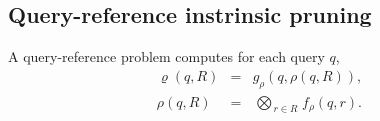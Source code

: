\documentclass[twoside,leqno,twocolumn]{article}
\newcommand{\bigvec}[1]{\mathop{\overrightarrow{#1}}}
\newcommand{\summary}{\hat{\sigma}}
\newcommand{\lo}[1]{#1^{l}}
\newcommand{\up}[1]{#1^{u}}
\newcommand{\distlo}{\lo{d}}
\newcommand{\distup}{\up{d}}
\newcommand{\dist}[2]{d(#1,#2)}
\newcommand{\nameOp}[2]{\mathop{#1\nolimits\!\!_{#2}}}
\newcommand{\nameop}[2]{{\scriptstyle\:}#1_{\!#2}}
\newcommand{\myOp}[1]{\nameOp{\bigotimes}{#1}}
\newcommand{\myop}[1]{\nameop{\otimes}{#1}}
\newcommand{\letterglob}{\psi}
\newcommand{\opglob}{\myop{\letterglob}}
\newcommand{\fglob}{f_{\!\letterglob}}
\newcommand{\canpruneglob}{C_{\!\letterglob}}
\newcommand{\deltaglob}{\summary_{\!\letterglob}}
\newcommand{\letterqr}{\rho}
\newcommand{\outqr}{\varrho}
\newcommand{\inqr}{\rho}
\newcommand{\Opqr}{\myOp{\letterqr}}
\newcommand{\fqr}{f_{\!\letterqr}}
\newcommand{\gqr}{g_{\!\letterqr}}
\newcommand{\letterstat}{s}
\newcommand{\outstat}{\sigma}
\newcommand{\opstat}{\myop{\letterstat}}
\newcommand{\fstat}{f_{\!\letterstat}}
\begin{document}
%


\subsection{Query-reference instrinsic pruning}
A query-reference problem computes for each query $q$,
\begin{eqnarray}
\outqr(q, R) &=& \gqr(q, \inqr(q, R)),
\\
\inqr(q, R) &=& \Opqr_{r \in R} \fqr(q, r).
\label{eqn:qrdef}
\end{eqnarray}
\end{document}
